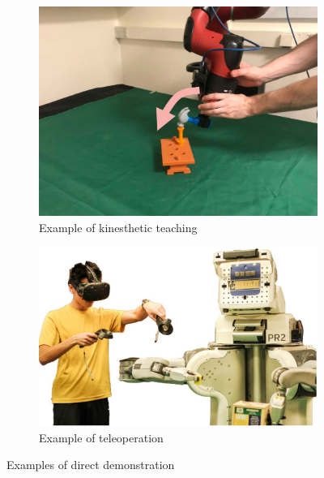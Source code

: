 \begin{figure}[tb]
     \centering
     \begin{subfigure}[b]{0.45\textwidth}
         \includegraphics[width=\textwidth]{figures/images/direct_demonstration/kinesthetic.jpg}
         \caption{Example of kinesthetic teaching~\cite{johns2021coarse_to_fine}}
         \label{fig:kinesthetic}
     \end{subfigure}
     \hfill
     \begin{subfigure}[b]{0.5\textwidth}
         \includegraphics[width=\textwidth]{figures/images/direct_demonstration/teleoperation.jpg}
         \caption{Example of teleoperation~\cite{zhang2018deep_vr_teleoperation}}
         \vspace{0.46cm}
         \label{fig:teleoperation}
     \end{subfigure}

    \caption{Examples of direct demonstration}
    \label{fig:direct_demonstrations}
\end{figure}

